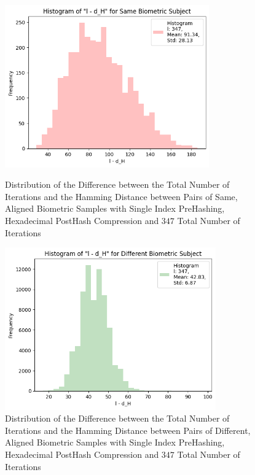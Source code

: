 \begin{enumerate}
\begin{itemize}
            \begin{figure}[H]
                \centering
                \begin{minipage}[b]{0.48\linewidth}
                    \centering
                    \includegraphics[width=\linewidth,height=7cm,keepaspectratio]{latex-img/l-dHconfig2_same_compression.png}
                    \caption{Distribution of the Difference between the Total Number of Iterations and the Hamming Distance between Pairs of Same, Aligned Biometric Samples with Single Index PreHashing, Hexadecimal PostHash Compression and $347$ Total Number of Iterations}
                    \label{l-dHconfig1_same}
                \end{minipage}
                \hfill
                \begin{minipage}[b]{0.48\linewidth}
                    \centering
                    \includegraphics[width=\linewidth,height=7cm,keepaspectratio]{latex-img/l-dHconfig2_diff_compression.png}
                    \caption{Distribution of the Difference between the Total Number of Iterations and the Hamming Distance between Pairs of Different, Aligned Biometric Samples with Single Index PreHashing, Hexadecimal PostHash Compression and $347$ Total Number of Iterations}
                    \label{l-dHconfig1_diff}
                \end{minipage}
            \end{figure}


\end{itemize}
\end{enumerate}
